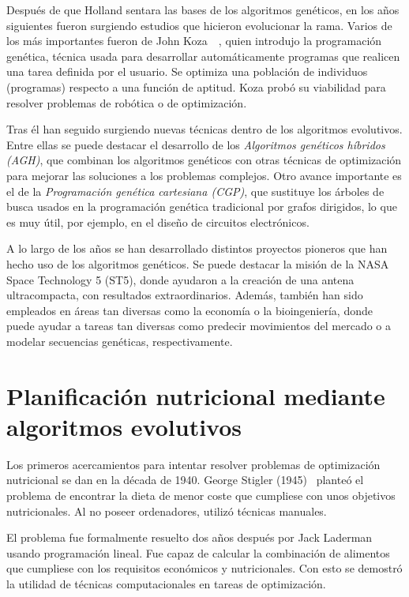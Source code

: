 Después de que Holland sentara las bases de los algoritmos genéticos, en los años siguientes fueron surgiendo estudios que hicieron evolucionar la rama. Varios de los más importantes fueron de John Koza~\cite{koza1992}~\cite{koza1994}, quien introdujo la programación genética, técnica usada para desarrollar automáticamente programas que realicen una tarea definida por el usuario. Se optimiza una población de individuos (programas) respecto a una función de aptitud. Koza probó su viabilidad para resolver problemas de robótica o de optimización.

Tras él han seguido surgiendo nuevas técnicas dentro de los algoritmos evolutivos. Entre ellas se puede destacar el desarrollo de los \textit{Algoritmos genéticos híbridos (AGH)}, que combinan los algoritmos genéticos con otras técnicas de optimización para mejorar las soluciones a los problemas complejos. Otro avance importante es el de la \textit{Programación genética cartesiana (CGP)}, que sustituye los árboles de busca usados en la programación genética tradicional por grafos dirigidos, lo que es muy útil, por ejemplo, en el diseño de circuitos electrónicos.

A lo largo de los años se han desarrollado distintos proyectos pioneros que han hecho uso de los algoritmos genéticos. Se puede destacar la misión de la NASA Space Technology 5 (ST5), donde ayudaron a la creación de una antena ultracompacta, con resultados extraordinarios. Además, también han sido empleados en áreas tan diversas como la economía o la bioingeniería, donde puede ayudar a tareas tan diversas como predecir movimientos del mercado o a modelar secuencias genéticas, respectivamente.


\section{Planificación nutricional mediante algoritmos evolutivos}

Los primeros acercamientos para intentar resolver problemas de optimización nutricional se dan en la década de 1940. George Stigler (1945)~\cite{stigler1945} planteó el problema de encontrar la dieta de menor coste que cumpliese con unos objetivos nutricionales. Al no poseer ordenadores, utilizó técnicas manuales.

El problema fue formalmente resuelto dos años después por Jack Laderman usando programación lineal. Fue capaz de calcular la combinación de alimentos que cumpliese con los requisitos económicos y nutricionales. Con esto se demostró la utilidad de técnicas computacionales en tareas de optimización.

